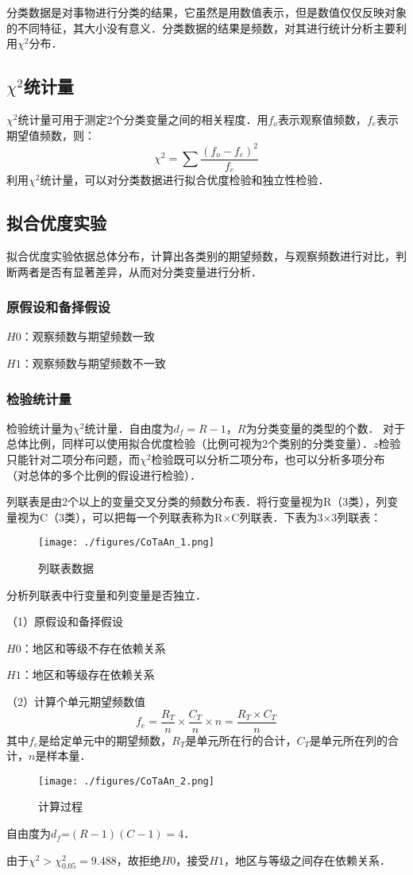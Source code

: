 分类数据是对事物进行分类的结果，它虽然是用数值表示，但是数值仅仅反映对象的不同特征，其大小没有意义．分类数据的结果是频数，对其进行统计分析主要利用$\chi^2$分布．
\subsection{$\chi^2$统计量}
$\chi^2$统计量可用于测定2个分类变量之间的相关程度．用$f_o$表示观察值频数，$f_e$表示期望值频数，则：
\begin{equation}
\chi^2 =  \sum \frac {(f_o-f_e)^2}{f_e}
\end{equation}
利用$\chi^2$统计量，可以对分类数据进行拟合优度检验和独立性检验．
\subsection{拟合优度实验}
拟合优度实验依据总体分布，计算出各类别的期望频数，与观察频数进行对比，判断两者是否有显著差异，从而对分类变量进行分析．
\subsubsection{原假设和备择假设}
$H0$：观察频数与期望频数一致

$H1$：观察频数与期望频数不一致
\subsubsection{检验统计量}
检验统计量为$\chi^2$统计量．自由度为$d_f = R-1$，$R$为分类变量的类型的个数．
对于总体比例，同样可以使用拟合优度检验（比例可视为2个类别的分类变量）．$z$检验只能针对二项分布问题，而$\chi^2$检验既可以分析二项分布，也可以分析多项分布（对总体的多个比例的假设进行检验）．
\begin{example}{}
列联表是由2个以上的变量交叉分类的频数分布表．将行变量视为R（3类），列变量视为C（3类），可以把每一个列联表称为R×C列联表．下表为3×3列联表：
\begin{figure}[ht]
\centering
\texttt{[image: ./figures/CoTaAn\_1.png]}
\caption{列联表数据} \label{CoTaAn_fig1}
\end{figure}
分析列联表中行变量和列变量是否独立．

（1）原假设和备择假设

$H0$：地区和等级不存在依赖关系

$H1$：地区和等级存在依赖关系

（2）计算个单元期望频数值
\begin{equation}
f_e=\frac {R_T}{n}\times \frac {C_T}{n}\times n =\frac{R_T \times C_T}{n}
\end{equation}
其中$f_e$是给定单元中的期望频数，$R_T$是单元所在行的合计，$C_T$是单元所在列的合计，$n$是样本量．
\begin{figure}[ht]
\centering
\texttt{[image: ./figures/CoTaAn\_2.png]}
\caption{计算过程} \label{CoTaAn_fig2}
\end{figure}
自由度为$d_f$=$(R-1)(C-1)=4$．

由于$\chi^2>\chi^2_{0.05}=9.488$，故拒绝$H0$，接受$H1$，地区与等级之间存在依赖关系．
\end{example}
